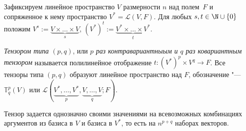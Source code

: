 Зафиксируем линейное пространство $V$ размерности $n$ над полем~$F$ и сопряженное к нему пространство $V^* = \mathcal{L}(V, F)$. Для любых $s, t \in \N \cup \{0\}$ положим $V^s := \underbrace{V \times \dots \times V}_{s}$, $(V^*)^t := \underbrace{V^* \times \dots \times V^*}_{t}$.

\begin{definition}
    \textit{Тензором типа $(p, q)$}, или \textit{$p$ раз контравариантныым и $q$ раз ковариантным тензором} называется полилинейное отображение $t: (V^*)^p \times V^q \rightarrow F$. Все тензоры типа $(p, q)$ образуют линейное пространство над $F$, обозначение "--- $\mathbb{T}^p_q(V)$ или $\mathcal{L}(\underbrace{V^*, \dots, V^*}_{p}, \underbrace{V, \dots, V}_{q}; F)$.
\end{definition}

\begin{note}
    Тензор задается однозначно своими значениями на всевозможных комбинациях аргументов из базиса в $V$ и базиса в $V^*$, то есть на $n^{p + q}$ наборах векторов.
\end{note}

